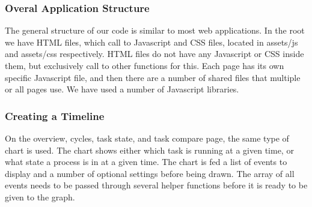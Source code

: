 \documentclass{hmcclinic}
\begin{document}
  \subsubsection{Overal Application Structure}

  The general structure of our code is similar to
  most web applications. In the root we have HTML files, which call to
  Javascript and CSS files, located in assets/js and assets/css respectively.
  HTML files do not have any Javascript or CSS inside them, but exclusively call
  to other functions for this. Each page has its own specific Javascript file,
  and then there are a number of shared files that multiple or all pages use. We
  have used a number of Javascript libraries.
  \subsubsection{Creating a Timeline}
  On the overview, cycles, task state, and task compare page, the same type of
  chart is used. The chart shows either which task is running at a given time,
  or what state a process is in at a given time. The chart is fed a list of
  events to display and a number of optional settings before being drawn. The
  array of all events needs to be passed through several helper functions
  before it is ready to be given to the graph.
  
\end{document}
